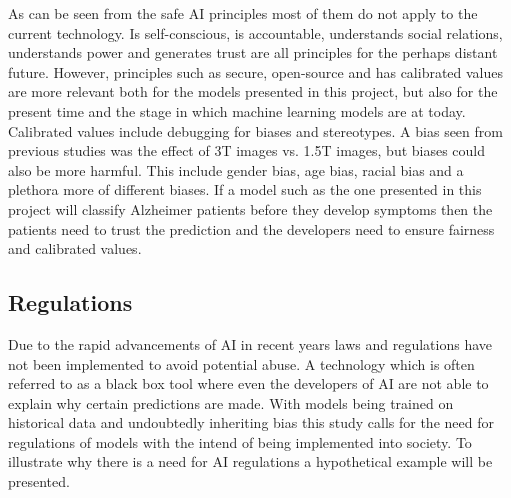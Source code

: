 \documentclass[12pt, fleqn, titlepage]{article}
\newcommand{\1}[1]{\mathds{1}\left[#1\right]}
\begin{document}
\noindent
As can be seen from the safe AI principles most of them do not apply to the current technology. Is self-conscious, is accountable, understands social relations, understands power and generates trust are all principles for the perhaps distant future. However, principles such as secure, open-source and has calibrated values are more relevant both for the models presented in this project, but also for the present time and the stage in which machine learning models are at today. Calibrated values include debugging for biases and stereotypes. A bias seen from previous studies was the effect of 3T images vs. 1.5T images, but biases could also be more harmful. This include gender bias, age bias, racial bias and a plethora more of different biases. If a model such as the one presented in this project will classify Alzheimer patients before they develop symptoms then the patients need to trust the prediction and the developers need to ensure fairness and calibrated values.


\subsection{Regulations}
Due to the rapid advancements of AI in recent years laws and regulations have not been implemented to avoid potential abuse. 
A technology which is often referred to as a black box tool where even the developers of AI are not able to explain why certain predictions are made. 
With models being trained on historical data and undoubtedly inheriting bias this study calls for the need for regulations of models with the intend of being implemented into society. 
To illustrate why there is a need for AI regulations a hypothetical example will be presented.
\end{document}
